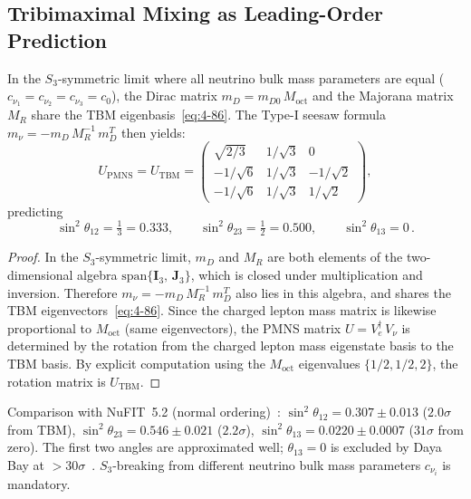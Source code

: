 \subsection{Tribimaximal Mixing as Leading-Order Prediction}
\label{sec:4-tbm}

\begin{theorem}\label{thm:4-tbm}
In the $S_3$-symmetric limit where all neutrino bulk mass parameters are equal ($c_{\nu_1} = c_{\nu_2} = c_{\nu_3} = c_0$), the Dirac matrix $m_D = m_{D0}\, M_{\mathrm{oct}}$ and the Majorana matrix $M_R$ share the TBM eigenbasis~\eqref{eq:4-86}. The Type-I seesaw formula $m_\nu = -m_D\, M_R^{-1}\, m_D^T$ then yields:
\begin{equation}
  U_{\mathrm{PMNS}} = U_{\mathrm{TBM}} = \begin{pmatrix}
    \sqrt{2/3} & 1/\sqrt{3} & 0 \\
    -1/\sqrt{6} & 1/\sqrt{3} & -1/\sqrt{2} \\
    -1/\sqrt{6} & 1/\sqrt{3} & 1/\sqrt{2}
  \end{pmatrix},
  \label{eq:4-87}
\end{equation}
predicting
\begin{equation}
  \sin^2\theta_{12} = \tfrac{1}{3} = 0.333, \qquad
  \sin^2\theta_{23} = \tfrac{1}{2} = 0.500, \qquad
  \sin^2\theta_{13} = 0\,.
  \label{eq:4-88}
\end{equation}
\end{theorem}

\begin{proof}
In the $S_3$-symmetric limit, $m_D$ and $M_R$ are both elements of the two-dimensional algebra $\mathrm{span}\{\mathbf{I}_3,\, \mathbf{J}_3\}$, which is closed under multiplication and inversion. Therefore $m_\nu = -m_D\, M_R^{-1}\, m_D^T$ also lies in this algebra, and shares the TBM eigenvectors~\eqref{eq:4-86}. Since the charged lepton mass matrix is likewise proportional to $M_{\mathrm{oct}}$ (same eigenvectors), the PMNS matrix $U = V_e^\dagger\, V_\nu$ is determined by the rotation from the charged lepton mass eigenstate basis to the TBM basis. By explicit computation using the $M_{\mathrm{oct}}$ eigenvalues $\{1/2, 1/2, 2\}$, the rotation matrix is $U_{\mathrm{TBM}}$.
\end{proof}

Comparison with NuFIT~5.2 (normal ordering)~\cite{ch4:NuFIT2024}: $\sin^2\theta_{12} = 0.307 \pm 0.013$ ($2.0\sigma$ from TBM), $\sin^2\theta_{23} = 0.546 \pm 0.021$ ($2.2\sigma$), $\sin^2\theta_{13} = 0.0220 \pm 0.0007$ ($31\sigma$ from zero). The first two angles are approximated well; $\theta_{13} = 0$ is excluded by Daya Bay at $> 30\sigma$~\cite{ch4:DayaBay2012}. $S_3$-breaking from different neutrino bulk mass parameters $c_{\nu_i}$ is mandatory.


